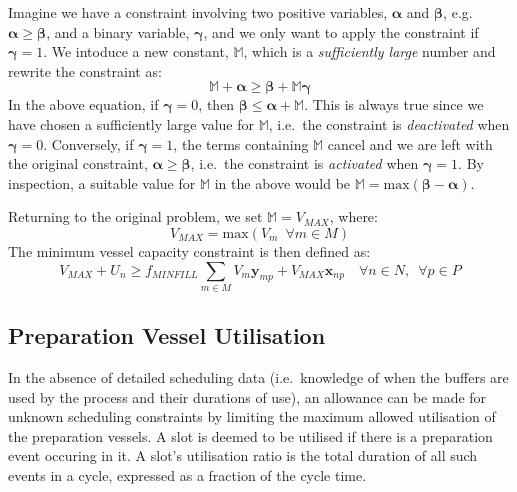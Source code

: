 Imagine we have a constraint involving two positive variables, 
$\boldsymbol{\alpha}$ and $\boldsymbol{\beta}$, e.g.\ 
$\boldsymbol{\alpha} \ge \boldsymbol{\beta}$, and a binary variable,
$\boldsymbol{\gamma}$, and we only want to apply the constraint if
$\boldsymbol{\gamma} = 1$.
We intoduce a new constant, $\mathbb{M}$, which is a \emph{sufficiently large}
number and rewrite the constraint as:
\begin{equation}
    \mathbb{M} + \boldsymbol{\alpha} \ge \boldsymbol{\beta}+ \mathbb{M}
    \boldsymbol{\gamma}
\end{equation}
In the above equation, if $\boldsymbol{\gamma} = 0$, then 
$\boldsymbol{\beta} \le \boldsymbol{\alpha} + \mathbb{M}$.
This is always true since we have chosen a sufficiently large value for
$\mathbb{M}$, i.e.\ the constraint is \emph{deactivated} when
$\boldsymbol{\gamma} = 0$.
Conversely, if $\boldsymbol{\gamma} = 1$, the terms containing $\mathbb{M}$
cancel and we are left with the original constraint,
$\boldsymbol{\alpha} \ge \boldsymbol{\beta}$, i.e.\ the constraint is
\emph{activated} when $\boldsymbol{\gamma} = 1$.
By inspection, a suitable value for $\mathbb{M}$ in the above would be
$\mathbb{M} = \text{max} \left( \boldsymbol{\beta} - \boldsymbol{\alpha} 
 \right)$.

Returning to the original problem, we set $\mathbb{M} = V_{\mathit{MAX}}$,
where:
\begin{equation}
    V_{\mathit{MAX}} = \text{max} \left( V_{m} \enspace \forall m \in M \right)
\end{equation}
The minimum vessel capacity constraint is then defined as:
\begin{equation}
    V_{\mathit{MAX}} + U_{n}
    \ge f_{\mathit{MINFILL}} \sum_{m \in M} V_{m} \boldsymbol{y}_{mp}
    + V_{\mathit{MAX}} \boldsymbol{x}_{np} 
    \quad \forall n \in N, \enspace \forall p \in P
    \label{eq.constr3b}
\end{equation}

\subsection{Preparation Vessel Utilisation}\label{SS.constr4}

In the absence of detailed scheduling data (i.e.\ knowledge of when the buffers
are used by the process and their durations of use), an allowance can be made
for unknown scheduling constraints by limiting the maximum allowed utilisation
of the preparation vessels.
A slot is deemed to be utilised if there is a preparation event occuring in
it. A slot's utilisation ratio is the total duration of all such events in a
cycle, expressed as a fraction of the cycle time.

